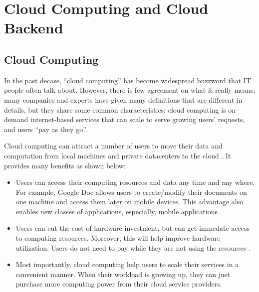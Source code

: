 \section{Cloud Computing and Cloud Backend}
\label{bg-cloud}

\subsection{Cloud Computing}

In the past decase, ``cloud computing'' has become widespread buzzword that IT
people often talk about. However, there is few agreement on what it really
means; many companies and experts have given many definitions
\cite{TwentyoneCloudDef, IBMCloudDef, PCMagCloudDef, Foster+08-CloudAndGrid}
that are different in details, but they share some common characteristics: cloud
computing is on-demand internet-based services that can scale to serve growing
users' requests, and users ``pay as they go''.


Cloud computing can attract a number of users to move their data and
computation from local machines and private datacenters to the cloud
\cite{AdobeCloudStat, AWSCustomer, GmailStat, GoogleDriveStat, DropboxStat,
AstroInCloud, FacebookStat, Luo+16-BigDataBioResearch}.
It provides many benefits as shown below:
\begin{itemize}
\item Users can access their computing resources and data any time and any
where. For example, Google Doc allows users to create/modify their documents on
one machine and access them later on mobile devices. This advantage also
enables new classes of applications, especially, mobile applications
\cite{DropboxWebsite, GmailWebsite, GoogleDriveWebsite, iCloudWebsite,
SiriWebsite} 

\item Users can cut the cost of hardware investment, but can get immedate access
to computing resources. Moreover, this will help improve hardware utilization.
Users do not need to pay while they are not using the resources
\cite{Marston+11-CloudBusiness} .

\item Most importantly, cloud computing help users to scale their services in a
convenient manner. When their workload is growing up, they can just purchase
more computing power from their cloud service providers.
\end{itemize}

